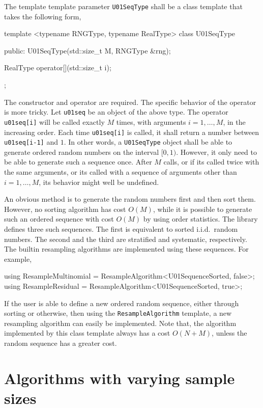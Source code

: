 The template template parameter \verb|U01SeqType| shall be a class template
that takes the following form,
\begin{cppcode}
  template <typename RNGType, typename RealType>
  class U01SeqType
  {
        public:
        U01SeqType(std::size_t M, RNGType &rng);

        RealType operator[](std::size_t i);
  };
\end{cppcode}
The constructor and operator are required. The specific behavior of the
operator is more tricky. Let \verb|u01seq| be an object of the above type. The
operator \verb|u01seq[i]| will be called exactly $M$ times, with arguments $i =
1,\dots,M$, in the increasing order. Each time \verb|u01seq[i]| is called, it
shall return a number between \verb|u01seq[i-1]| and $1$. In other words, a
\verb|U01SeqType| object shall be able to generate ordered random numbers on
the interval $[0, 1)$. However, it only need to be able to generate such a
sequence once. After $M$ calls, or if its called twice with the same arguments,
or its called with a sequence of arguments other than $i=1,\dots,M$, its
behavior might well be undefined.

An obvious method is to generate the random numbers first and then sort them.
However, no sorting algorithm has cost $O(M)$, while it is possible to generate
such an ordered sequence with cost $O(M)$ by using order statistics. The
library defines three such sequences. The first is equivalent to sorted i.i.d.\
random numbers. The second and the third are stratified and systematic,
respectively. The builtin resampling algorithms are implemented using these
sequences. For example,
\begin{cppcode}
  using ResampleMultinomial = ResampleAlgorithm<U01SequenceSorted, false>;
  using ResampleResidual = ResampleAlgorithm<U01SequenceSorted, true>;
\end{cppcode}
If the user is able to define a new ordered random sequence, either through
sorting or otherwise, then using the \verb|ResampleAlgorithm| template, a new
resampling algorithm can easily be implemented. Note that, the algorithm
implemented by this class template always has a cost $O(N + M)$, unless the
random sequence has a greater cost.

\section{Algorithms with varying sample sizes}
\label{sec:Algorithms with varying sample sizes}

